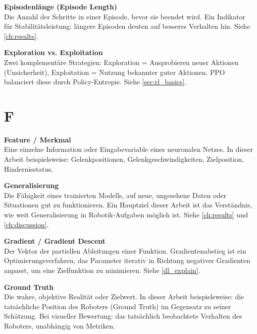\vspace{0.5cm}
\noindent\textbf{Episodenlänge (Episode Length)} \\
Die Anzahl der Schritte in einer Episode, bevor sie beendet wird. Ein Indikator für Stabilitätsleistung: längere Episoden deuten auf besseres Verhalten hin. Siehe \autoref{ch:results}.

\vspace{0.5cm}
\noindent\textbf{Exploration vs. Exploitation} \\
Zwei komplementäre Strategien: Exploration = Ausprobieren neuer Aktionen (Unsicherheit), Exploitation = Nutzung bekannter guter Aktionen. PPO balanciert diese durch Policy-Entropie. Siehe \autoref{sec:rl_basics}.

\section*{F}

\vspace{0.3cm}
\noindent\textbf{Feature / Merkmal} \\
Eine einzelne Information oder Eingabevariable eines neuronalen Netzes. In dieser Arbeit beispielsweise: Gelenkpositionen, Gelenkgeschwindigkeiten, Zielposition, Hindernisstatus.

\vspace{0.5cm}
\noindent\textbf{Generalisierung} \\
Die Fähigkeit eines trainierten Modells, auf neue, ungesehene Daten oder Situationen gut zu funktionieren. Ein Hauptziel dieser Arbeit ist das Verständnis, wie weit Generalisierung in Robotik-Aufgaben möglich ist. Siehe \autoref{ch:results} und \autoref{ch:discussion}.

\vspace{0.5cm}
\noindent\textbf{Gradient / Gradient Descent} \\
Der Vektor der partiellen Ableitungen einer Funktion. Gradientenabstieg ist ein Optimierungsverfahren, das Parameter iterativ in Richtung negativer Gradienten anpasst, um eine Zielfunktion zu minimieren. Siehe \autoref{dl_explain}.

\vspace{0.3cm}
\noindent\textbf{Ground Truth} \\
Die wahre, objektive Realität oder Zielwert. In dieser Arbeit beispielsweise: die tatsächliche Position des Roboters (Ground Truth) im Gegensatz zu seiner Schätzung. Bei visueller Bewertung: das tatsächlich beobachtete Verhalten des Roboters, unabhängig von Metriken.

